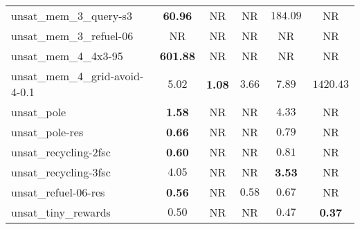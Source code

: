 \begin{tabular}{lccccc}
unsat\_mem\_3\_query-s3 & \textbf{60.96} & NR & NR & $184.09$ & NR \\
unsat\_mem\_3\_refuel-06 & NR & NR & NR & NR & NR \\
unsat\_mem\_4\_4x3-95 & \textbf{601.88} & NR & NR & NR & NR \\
unsat\_mem\_4\_grid-avoid-4-0.1 & $5.02$ & \textbf{1.08} & $3.66$ & $7.89$ & $1420.43$ \\
unsat\_pole & \textbf{1.58} & NR & NR & $4.33$ & NR \\
unsat\_pole-res & \textbf{0.66} & NR & NR & $0.79$ & NR \\
unsat\_recycling-2fsc & \textbf{0.60} & NR & NR & $0.81$ & NR \\
unsat\_recycling-3fsc & $4.05$ & NR & NR & \textbf{3.53} & NR \\
unsat\_refuel-06-res & \textbf{0.56} & NR & $0.58$ & $0.67$ & NR \\
unsat\_tiny\_rewards & $0.50$ & NR & NR & $0.47$ & \textbf{0.37} \\
\bottomrule
\end{tabular}

